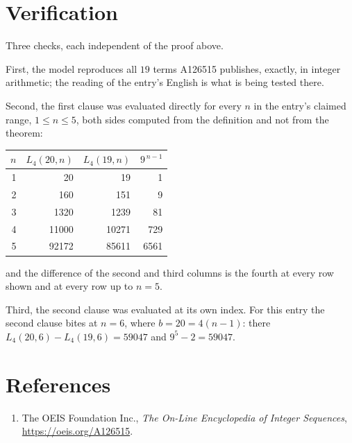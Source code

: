 \documentclass[11pt,a4paper]{article}
\theoremstyle{plain}
\theoremstyle{definition}
\begin{document}
\section{Verification}

Three checks, each independent of the proof above.

First, the model reproduces all $19$ terms A126515 publishes, exactly, in integer
arithmetic; the reading of the entry's English is what is being tested there.

Second, the first clause was evaluated directly for every $n$ in the entry's claimed range,
$1\le n\le5$, both sides computed from the definition and not from the theorem:

\begin{center}
\begin{tabular}{rrrr}
$n$ & $L_{4}(20,n)$ & $L_{4}(19,n)$ & $9^{\,n-1}$ \\ \hline
1 & 20 & 19 & 1 \\
2 & 160 & 151 & 9 \\
3 & 1320 & 1239 & 81 \\
4 & 11000 & 10271 & 729 \\
5 & 92172 & 85611 & 6561 \\
\end{tabular}
\end{center}

\noindent and the difference of the second and third columns is the fourth at every row shown
and at every row up to $n=5$.

Third, the second clause was evaluated at its own index. For this entry the second clause bites at $n=6$, where $b=20=4(n-1)$: there $L_{4}(20,6)-L_{4}(19,6)=59047$ and $9^{5}-2=59047$.

\section*{References}
\begin{enumerate}
\item The OEIS Foundation Inc., \emph{The On-Line Encyclopedia of Integer Sequences},
\url{https://oeis.org/A126515}.
\end{enumerate}
\end{document}
